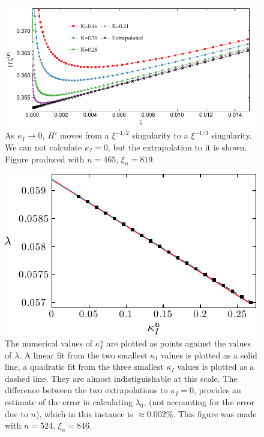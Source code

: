\documentclass{jfm}
\begin{document}
\begin{figure}
  \centerline{\includegraphics{./../../Graphs/hprime-x.pdf}}\label{fig:hprime-x}
  \caption{As $\kappa_I\to 0$, $H'$ moves from a $\xi^{-1/2}$ singularity
           to a $\xi^{-1/3}$ singularity. We can not calculate $\kappa_I=0$, 
           but the extrapolation to it is shown. Figure produced with $n=465$,
           $\xi_n = 819$.}
\end{figure}
\begin{figure}
  \centerline{\includegraphics{./../../Graphs/l0-edited.pdf}}
  \caption{The numerical values of $\kappa_I^u$ are plotted as points against
           the values of $\lambda$. A linear fit from the two smallest $\kappa_I$ 
           values is plotted 
           as a solid line, a quadratic fit from the three smallest $\kappa_I$ 
           values is plotted as a dashed line.
           They are almost indistiguishable at this scale. 
           The difference between the two extrapolations to $\kappa_I=0$,  
           provides an estimate of the error in calculating $\lambda_0$, 
           (not accounting for the error due to $n$), which in this instance is 
           $\approx 0.002\%$. This figure was made with $n=524$, $\xi_n=846$. }
\end{figure}
\end{document}
